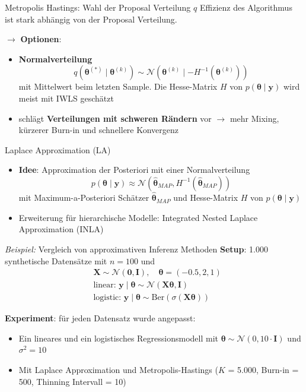 \documentclass[
  ignorenonframetext,
  aspectratio=169,
]{beamer}
\providecommand{\tightlist}{%
  \setlength{\itemsep}{0pt}\setlength{\parskip}{0pt}}
\newcommand{\bnull}{\bm{0}}
\newcommand{\by}{\bm{y}}
\newcommand{\bI}{\bm{I}}
\newcommand{\bX}{\bm{X}}
\newcommand{\Ncal}{\mathcal{N}}
\newcommand{\ssd}{\sigma^2}
\newcommand{\btheta}{\bm{\theta}}
\newcommand{\hbtheta}{\hat{\bm{\theta}}}
\begin{document}
\begin{frame}{Metropolis Hastings: Wahl der Proposal Verteilung \(q\)}
\protect{}\label{metropolis-hastings-wahl-der-proposal-verteilung-q}
Effizienz des Algorithmus ist stark abhängig von der Proposal
Verteilung.

\(\to\) \textbf{Optionen}:

\begin{itemize}
\item
  \textbf{Normalverteilung} \[
  q(\btheta^{(*)} \mid \btheta^{(k)}) \sim \Ncal(\btheta^{(k)} \mid -H^{-1}(\btheta^{(k)}))
  \] mit Mittelwert beim letzten Sample. Die Hesse-Matrix \(H\) von
  \(p(\btheta \mid \by)\) wird meist mit IWLS geschätzt
  \autocite{gamerman_markov_1998,lenk_bayesian_2000,scott_data_2011}
\item
  \textcite{scott_data_2011} schlägt \textbf{Verteilungen mit schweren
  Rändern} vor \(\to\) mehr Mixing, kürzerer Burn-in und schnellere
  Konvergenz
\end{itemize}
\end{frame}

\begin{frame}{Laplace Approximation (LA)
\autocite{tierney_accurate_1986}}
\protect{}\label{laplace-approximation-la-tierney_accurate_1986}
\begin{itemize}
\tightlist
\item
  \textbf{Idee}: Approximation der Posteriori mit einer Normalverteilung
  \[
  p(\btheta \mid \by) \approx \Ncal(\hbtheta_{MAP}, H^{-1}(\hbtheta_{MAP}))
  \] mit Maximum-a-Posteriori Schätzer \(\hbtheta_{MAP}\) und
  Hesse-Matrix \(H\) von \(p(\btheta \mid \by)\)
\item
  Erweiterung für hierarchische Modelle: Integrated Nested Laplace
  Approximation (INLA) \autocite{rue_approximate_2009}
\end{itemize}
\end{frame}

\begin{frame}{\emph{Beispiel:} Vergleich von approximativen Inferenz
Methoden}
\protect{}\label{beispiel-vergleich-von-approximativen-inferenz-methoden}
\textbf{Setup}: 1.000 synthetische Datensätze mit \(n=100\) und \[
\begin{aligned}
    &\bX \sim \Ncal(\bnull, \bI), \quad \btheta = (-0.5, 2, 1)\\
    &\text{linear: } \by \mid \btheta \sim \Ncal(\bX \btheta, \bI)\\
    &\text{logistic: } \by \mid \btheta \sim \text{Ber}(\sigma(\bX \btheta))
\end{aligned}
\]

\textbf{Experiment}: für jeden Datensatz wurde angepasst:

\begin{itemize}
\tightlist
\item
  Ein lineares und ein logistisches Regressionsmodell mit
  \(\btheta \sim \Ncal(0, 10 \cdot \bI)\) und \(\ssd = 10\)
\item
  Mit Laplace Approximation und Metropolis-Hastings (\(K\) = 5.000,
  Burn-in = 500, Thinning Intervall = 10)
\end{itemize}
\end{frame}
\end{document}
